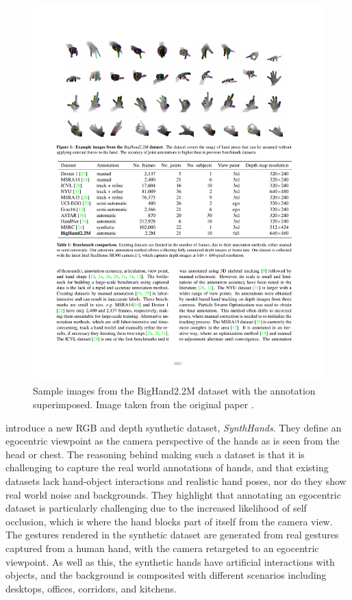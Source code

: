 \begin{figure}
\includegraphics[width=\linewidth]{figs/general/bighand22m.pdf}
\caption{Sample images from the BigHand2.2M dataset with the annotation superimposed. Image taken from the original paper \cite{yuan2017bighand2}.}
\label{figs:lr:bighand}
\end{figure}

\cite{mueller2017real} introduce a new RGB and depth synthetic dataset, {\slshape SynthHands}. They define an egocentric viewpoint as the camera perspective of the hands as is seen from the head or chest. The reasoning behind making such a dataset is that it is challenging to capture the real world annotations of hands, and that existing datasets lack hand-object interactions and realistic hand poses, nor do they show real world noise and backgrounds. They highlight that annotating an egocentric dataset is particularly challenging due to the increased likelihood of self occlusion, which is where the hand blocks part of itself from the camera view. The gestures rendered in the synthetic dataset are generated from real gestures captured from a human hand, with the camera retargeted to an egocentric viewpoint. As well as this, the synthetic hands have artificial interactions with objects, and the background is composited with different scenarios including desktops, offices, corridors, and kitchens.

